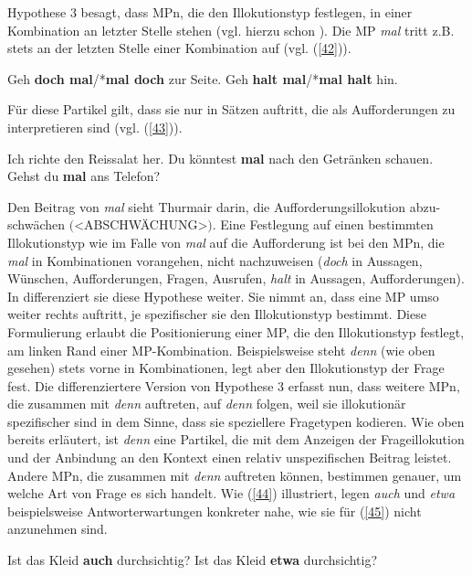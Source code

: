 Hypothese 3 besagt, dass MPn, die den Illokutionstyp  festlegen, in einer Kombination an letzter Stelle stehen (vgl. hierzu schon \citealt[222, 225]{Dahl1988}). Die MP \textit{mal} tritt z.B. stets an der letzten Stelle einer Kombination auf (vgl. (\ref{42})). 

\begin{exe}
	\ex\label{42} 
		\begin{xlist}	
			\ex\label{42a} Geh \textbf{doch mal}/*\textbf{mal doch} zur Seite.
			\ex\label{42b} Geh \textbf{halt mal}/*\textbf{mal halt} hin.
			\end{xlist}
\end{exe}
Für diese Partikel gilt, dass sie nur in Sätzen auftritt, die als Aufforderungen  zu interpretieren sind (vgl. (\ref{43})).

\begin{exe}
	\ex\label{43} 
		\begin{xlist}	
			\ex\label{43a} Ich richte den Reissalat her. Du könntest \textbf{mal} nach den Getränken schauen.
			\ex\label{43b} Gehst du \textbf{mal} ans Telefon?
			\hfill\hbox {\citet[184/185]{Thurmair1989}}
		\end{xlist}
\end{exe}
Den Beitrag von \textit{mal} sieht Thurmair darin, die Aufforderungsillokution abzu-schwächen $($<ABSCHW\"ACHUNG>$)$. Eine Festlegung auf einen bestimmten Illokutionstyp wie im Falle von \textit{mal} auf die Aufforderung ist bei den MPn, die \textit{mal} in Kombinationen vorangehen, nicht nachzuweisen (\textit{doch} in Aussagen, Wünschen, Aufforderungen, Fragen, Ausrufen, \textit{halt} in Aussagen, Aufforderungen). In \citet[30]{Thurmair1991} differenziert sie diese Hypothese weiter. Sie nimmt an, dass eine MP umso weiter rechts auftritt, je spezifischer sie den Illokutionstyp bestimmt. Diese Formulierung erlaubt die Positionierung einer MP, die den Illokutionstyp festlegt, am linken Rand einer MP-Kombination. Beispielsweise steht \textit{denn} (wie oben gesehen) stets vorne in Kombinationen, legt aber den Illokutionstyp der Frage fest. Die differenziertere Version von Hypothese 3 erfasst nun, dass weitere MPn, die zusammen mit \textit{denn} auftreten, auf \textit{denn} folgen, weil sie illokutionär spezifischer sind in dem Sinne, dass sie speziellere Fragetypen kodieren. Wie oben bereits erläutert, ist \textit{denn} eine Partikel, die mit dem Anzeigen der Frageillokution und der Anbindung an den Kontext einen relativ unspezifi\-schen Beitrag leistet. Andere MPn, die zusammen mit \textit{denn} auftreten können, bestimmen genauer, um welche Art von Frage es sich handelt. Wie (\ref{44}) illustriert, legen \textit{auch} und \textit{etwa} beispielsweise Antworterwartungen  konkreter nahe, wie sie für (\ref{45}) nicht anzunehmen sind.
\begin{exe}
	\ex\label{44} 
		\begin{xlist}	
			\ex\label{44a} Ist das Kleid \textbf{auch} durchsichtig?
			\ex\label{44b} Ist das Kleid \textbf{etwa} durchsichtig?
			\hfill\hbox {\citet[27]{Thurmair1991}}
		\end{xlist}
\end{exe}

